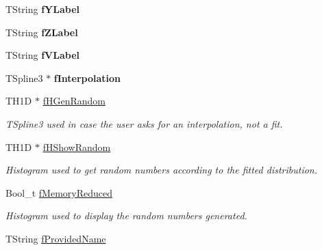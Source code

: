 \begin{DoxyCompactItemize}
\item 
\hypertarget{classTSplineFit_aedbe73c686b37f10172442b078a00ab1}{
TString {\bfseries fYLabel}}
\label{classTSplineFit_aedbe73c686b37f10172442b078a00ab1}

\item 
\hypertarget{classTSplineFit_a363bf7a37d26de273c10855d411d3dd0}{
TString {\bfseries fZLabel}}
\label{classTSplineFit_a363bf7a37d26de273c10855d411d3dd0}

\item 
\hypertarget{classTSplineFit_a79c12343aa2d43f9bf8610cdb8667e32}{
TString {\bfseries fVLabel}}
\label{classTSplineFit_a79c12343aa2d43f9bf8610cdb8667e32}

\item 
\hypertarget{classTSplineFit_a5358d22ad5cca034f60dbb18841b7daa}{
TSpline3 $\ast$ {\bfseries fInterpolation}}
\label{classTSplineFit_a5358d22ad5cca034f60dbb18841b7daa}

\item 
\hypertarget{classTSplineFit_afdd6aa6816aaaee17a4223c8985ec35c}{
TH1D $\ast$ \hyperlink{classTSplineFit_afdd6aa6816aaaee17a4223c8985ec35c}{fHGenRandom}}
\label{classTSplineFit_afdd6aa6816aaaee17a4223c8985ec35c}

\begin{DoxyCompactList}\small\item\em TSpline3 used in case the user asks for an interpolation, not a fit. \item\end{DoxyCompactList}\item 
\hypertarget{classTSplineFit_a06950b3b83d47f0586d5585070758338}{
TH1D $\ast$ \hyperlink{classTSplineFit_a06950b3b83d47f0586d5585070758338}{fHShowRandom}}
\label{classTSplineFit_a06950b3b83d47f0586d5585070758338}

\begin{DoxyCompactList}\small\item\em Histogram used to get random numbers according to the fitted distribution. \item\end{DoxyCompactList}\item 
\hypertarget{classTSplineFit_af8a9f30c5273edec42b86819b52d3d1d}{
Bool\_\-t \hyperlink{classTSplineFit_af8a9f30c5273edec42b86819b52d3d1d}{fMemoryReduced}}
\label{classTSplineFit_af8a9f30c5273edec42b86819b52d3d1d}

\begin{DoxyCompactList}\small\item\em Histogram used to display the random numbers generated. \item\end{DoxyCompactList}\item 
\hypertarget{classTSplineFit_aef1b944aa8ae640342c71de8f2c1bc0f}{
TString \hyperlink{classTSplineFit_aef1b944aa8ae640342c71de8f2c1bc0f}{fProvidedName}}
\label{classTSplineFit_aef1b944aa8ae640342c71de8f2c1bc0f}


\end{DoxyCompactItemize}
